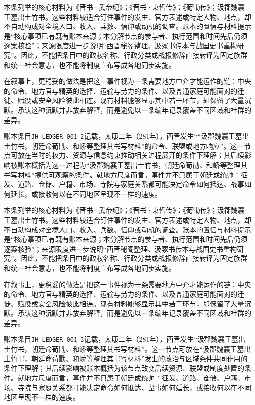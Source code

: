 本条列举的核心材料为《晋书·武帝纪》；《晋书·束皙传》；《荀勖传》；汲郡魏襄王墓出土竹书。这些材料较适合钉住事件的发生、官方表述或特定人物、地点，却不自动构成对全境人口、收入、兵数、信仰或动机的调查。账本的置信与材料提示是“核心事项已有既有账本来源；本分解节点的参与者、执行范围和时间先后仍须逐案核验”；来源限度进一步说明“西晋秘阁整理、汲冢书传本与战国史书重构研究”。因此，不能把条目中的政权名称、行政分类或战报修辞直接转译为固定族群和统一社会意志，也不能将制度宣布写成各地同步实施。

在叙事上，更稳妥的做法是把这一事件视为一条需要地方中介才能运作的链：中央的命令、地方官与精英的选择、运输与劳力的条件、以及普通家庭可能面对的迁徙、赋役或安全风险彼此相连。现有材料能够显示其中若干环节，却保留了大量沉默。承认这种沉默并非放弃解释，而是避免以一条编年记录覆盖不同区域和社群的差异。

账本条目\texttt{JH-LEDGER-001-2}记载，太康二年（281年），西晋发生““汲郡魏襄王墓出土竹书，朝廷命荀勖、和峤等整理其书写材料”的命令、联盟或地方响应”。这一节点可放在当时的权力、资源与信息约束推动相关过程展开的条件下理解；其后续影响被账本概括为这一过程为“汲郡魏襄王墓出土竹书，朝廷命荀勖、和峤等整理其书写材料”提供可观察的条件。就地方尺度而言，事件并不只属于朝廷或统帅：征发、道路、仓储、户籍、市场、寺院与家庭关系都可能决定命令如何抵达、战事如何延长，或接收何以在不同地区呈现不一样的速度。

本条列举的核心材料为《晋书·武帝纪》；《晋书·束皙传》；《荀勖传》；汲郡魏襄王墓出土竹书。这些材料较适合钉住事件的发生、官方表述或特定人物、地点，却不自动构成对全境人口、收入、兵数、信仰或动机的调查。账本的置信与材料提示是“核心事项已有既有账本来源；本分解节点的参与者、执行范围和时间先后仍须逐案核验”；来源限度进一步说明“西晋秘阁整理、汲冢书传本与战国史书重构研究”。因此，不能把条目中的政权名称、行政分类或战报修辞直接转译为固定族群和统一社会意志，也不能将制度宣布写成各地同步实施。

在叙事上，更稳妥的做法是把这一事件视为一条需要地方中介才能运作的链：中央的命令、地方官与精英的选择、运输与劳力的条件、以及普通家庭可能面对的迁徙、赋役或安全风险彼此相连。现有材料能够显示其中若干环节，却保留了大量沉默。承认这种沉默并非放弃解释，而是避免以一条编年记录覆盖不同区域和社群的差异。

账本条目\texttt{JH-LEDGER-001-3}记载，太康二年（281年），西晋发生“汲郡魏襄王墓出土竹书，朝廷命荀勖、和峤等整理其书写材料”。这一节点可放在“汲郡魏襄王墓出土竹书，朝廷命荀勖、和峤等整理其书写材料”发生的政治与区域条件共同作用的条件下理解；其后续影响被账本概括为该节点改变后续资源、联盟或制度处置的条件。就地方尺度而言，事件并不只属于朝廷或统帅：征发、道路、仓储、户籍、市场、寺院与家庭关系都可能决定命令如何抵达、战事如何延长，或接收何以在不同地区呈现不一样的速度。

